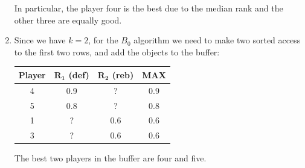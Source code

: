 \begin{enumerate}
        In particular, the player four is the best due to the median rank and the other three are equally good. 
    \item Since we have $k=2$, for the $B_0$ algorithm we need to make two sorted access to the first two rows, and add the objects to the buffer: 
        \begin{table}[H]
            \centering
            \begin{tabular}{c|cc|c}
            \hline
            \textbf{Player} & \textbf{$\boldsymbol{R_1}$ (def)} & \textbf{$\boldsymbol{R_2}$ (reb)} & \textbf{MAX} \\ \hline
            4               & 0.9                               & ?                                 & 0.9                             \\
            5               & 0.8                               & ?                                 & 0.8                             \\
            1               & ?                                 & 0.6                               & 0.6                             \\
            3               & ?                                 & 0.6                               & 0.6                             \\ \hline
            \end{tabular}
        \end{table}
        The best two players in the buffer are four and five.


\end{enumerate}
